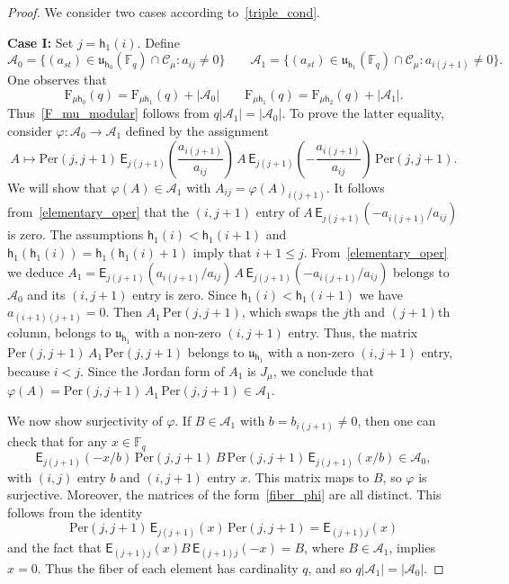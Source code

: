 \documentclass[10pt,a4paper]{amsart}
\newcommand{\EE}{\mathsf{E}}
\newcommand{\F}{\mathrm{F}}
\newcommand{\FF}{{\mathbb{F}}}
\newcommand{\hes}{\mathsf{h}}
\renewcommand{\u}{\mathfrak{u}}
\begin{document}
\begin{proof}
We consider two cases according to~\cref{triple_cond}. 
\medskip

{\noindent \bf Case I:} Set $j=\hes_1(i)$. Define 
$$
\mathcal{A}_0=\{(a_{st})\in \u_{\hes_0}(\FF_q)\cap \mathcal{C_\mu}: a_{ij}\neq 0\}\qquad
\mathcal{A}_1=\{(a_{st})\in \u_{\hes_1}(\FF_q)\cap \mathcal{C_\mu}: a_{i(j+1)}\neq 0\}.
$$
One observes that
$$
\F_{\mu\hes_0}(q)=\F_{\mu\hes_1}(q)+|\mathcal{A}_0|\qquad
\F_{\mu\hes_1}(q)=\F_{\mu\hes_2}(q)+|\mathcal{A}_1|. 
$$
Thus~\cref{F_mu_modular} follows from $q|\mathcal{A}_1|=|\mathcal{A}_0|$. To prove the latter equality, consider 
$\varphi: \mathcal{A}_0\to \mathcal{A}_1$ defined by the assignment
$$
A\mapsto \mathrm{Per}(j,j+1)\,\EE_{j(j+1)}\left(\frac{a_{i(j+1)}}{a_{ij}}\right)\,A\,\EE_{j(j+1)}\left(-\frac{a_{i(j+1)}}{a_{ij}}\right)\,\mathrm{Per}(j,j+1).
$$
We will show that $\varphi(A)\in\mathcal{A}_1$ with $A_{ij}=\varphi(A)_{i(j+1)}$. 
It follows from~\cref{elementary_oper} that the $(i,j+1)$ entry of $A\,\EE_{j(j+1)}\left(-{a_{i(j+1)}}/{a_{ij}}\right)$ is zero. The assumptions $\hes_1(i)<\hes_1(i+1)$ and $\hes_1(\hes_1(i))=\hes_1(\hes_1(i)+1)$ imply that $i+1\leq j$. From~\cref{elementary_oper} we deduce  $A_1=\EE_{j(j+1)}\left({a_{i(j+1)}}/{a_{ij}}\right)\,A\,\EE_{j(j+1)}\left(-{a_{i(j+1)}}/{a_{ij}}\right)$ belongs to $\mathcal{A}_0$ and its $(i,j+1)$ entry is zero. Since $\hes_1(i)<\hes_1(i+1)$ we have $a_{(i+1)(j+1)}=0$. Then $A_1\, \mathrm{Per}(j,j+1)$, which swaps the $j$th and $(j+1)$th column, belongs to $\u_{\hes_1}$ with a non-zero $(i,j+1)$ entry. Thus, the matrix $\mathrm{Per}(j,j+1)\, A_1\, \mathrm{Per}(j,j+1)$ belongs to $\u_{\hes_1}$ with a non-zero $(i,j+1)$ entry, because $i<j$. Since the Jordan form of $A_1$ is $J_\mu$, we conclude that $\varphi(A) = \mathrm{Per}(j,j+1)\, A_1\, \mathrm{Per}(j,j+1) \in \mathcal{A}_1$.


\smallskip

We now show surjectivity of $\varphi$. If $B\in \mathcal{A}_1$ with $b=b_{i(j+1)}\neq 0$, then one can check that for any $x\in\FF_q$ 
\begin{equation}\label{fiber_phi}
\EE_{j(j+1)}(-x/b)\,\mathrm{Per}(j,j+1)\,B\,\mathrm{Per}(j,j+1)\,\EE_{j(j+1)}(x/b)\in \mathcal{A}_0,
\end{equation}
with $(i,j)$ entry $b$ and $(i,j+1)$ entry $x$. This matrix maps to $B$, so $\varphi$ is surjective. Moreover, the matrices of the form~\cref{fiber_phi} are all distinct. This follows from the identity $$\mathrm{Per}(j,j+1)\,\EE_{j(j+1)}(x)\,\mathrm{Per}(j,j+1) = \EE_{(j+1)j}(x)$$
and the fact that $\EE_{(j+1)j}(x) B\, \EE_{(j+1)j}(-x) = B$, where $B \in \mathcal{A}_1$, implies $x = 0$. Thus the fiber of each element has cardinality $q$, and so $q|\mathcal{A}_1|=|\mathcal{A}_0|$.


\end{proof}
\end{document}

